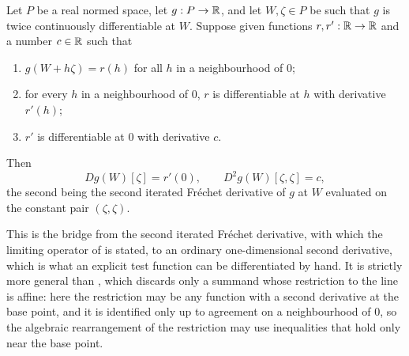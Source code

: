 \begin{lemma}
Let $P$ be a real normed space, let $g:P\to\mathbb{R}$, and let $W,\zeta\in P$ be such that
$g$ is twice continuously differentiable at $W$. Suppose given functions
$r,r':\mathbb{R}\to\mathbb{R}$ and a number $c\in\mathbb{R}$ such that
\begin{enumerate}
\item $g(W+h\zeta)=r(h)$ for all $h$ in a neighbourhood of $0$;
\item for every $h$ in a neighbourhood of $0$, $r$ is differentiable at $h$ with
derivative $r'(h)$;
\item $r'$ is differentiable at $0$ with derivative $c$.
\end{enumerate}
Then
\[
  Dg(W)[\zeta]=r'(0),
  \qquad
  D^2g(W)[\zeta,\zeta]=c,
\]
the second being the second iterated Fréchet derivative of $g$ at $W$ evaluated on
the constant pair $(\zeta,\zeta)$.

This is the bridge from the second iterated Fréchet derivative, with which the
limiting operator of  is stated, to an ordinary one-dimensional
second derivative, which is what an explicit test function can be differentiated by
hand. It is strictly more general than ,
which discards only a summand whose restriction to the line is affine: here the
restriction may be any function with a second derivative at the base point, and it
is identified only up to agreement on a neighbourhood of $0$, so the algebraic
rearrangement of the restriction may use inequalities that hold only near the base
point.
\end{lemma}
